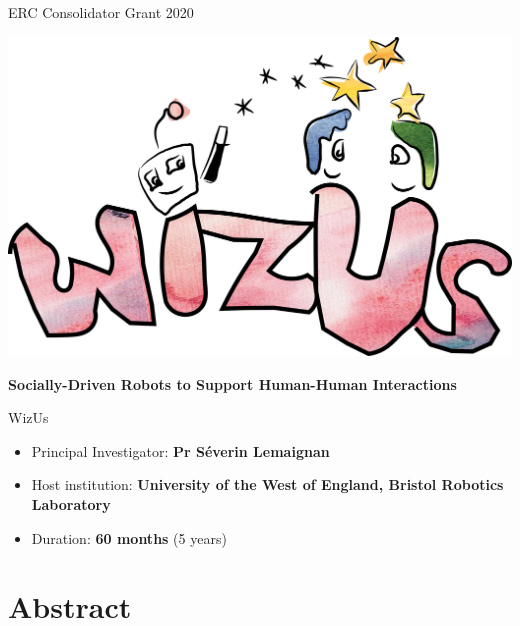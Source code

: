 \documentclass[11pt,a4paper]{report}
\title{\project}
\newcommand{\project}{WizUs\xspace}
\newcommand{\eu}[1]{}
\begin{document}
\maketitle

\begin{center}
    ERC Consolidator Grant 2020

    \vspace{2cm}
    \includegraphics[width=0.7\linewidth]{logo.png}

    \textbf{\LARGE Socially-Driven Robots to Support Human-Human Interactions}

    \vspace{2cm}
    {\Huge \project}

\end{center}

    \vspace{1cm}

\begin{itemize}
    \item Principal Investigator: \textbf{Pr Séverin Lemaignan}
    \item Host institution: \textbf{University of the West of England, Bristol Robotics
        Laboratory}
    \item Duration: \textbf{60 months} (5 years)
\end{itemize}

\section*{Abstract}\label{abstract}

\eu{The abstract (summary) should, at a glance, provide the reader with a clear
understanding of the objectives of the research proposal and how they will be
achieved. The abstract will be used as the short description of your research
proposal in the evaluation process and in communications to contact in
particular the potential remote referees and/or inform the Commission and/or the
programme management committees and/or relevant national funding agencies
(provided you give permission to do so where requested in the online proposal
submission forms, section 1). It must therefore be short and precise and should
not contain confidential information. \\
Please use plain typed text, avoiding formulae and other special characters. The
abstract must be written in English. There is a limit of 2000 characters (spaces
and line breaks included).}
\end{document}
